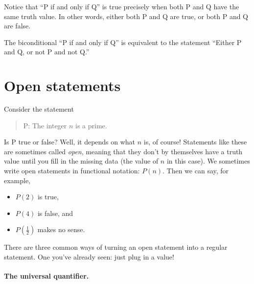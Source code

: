 \documentclass{tufte-book}
\begin{document}
Notice that ``P if and only if Q'' is true precisely when both P and Q have the same truth value. In other words, either both P and Q are true, or both P and Q are false.

\begin{proposition}\label{prop:biconditional-equiv-or}
  The biconditional ``P if and only if Q'' is equivalent to the statement ``Either P and Q, or not P and not Q.''
\end{proposition}


\section{Open statements}
\label{sec:open-statements}

Consider the statement
\begin{quote}
  P: The integer $n$ is a prime.
\end{quote}
Is P true or false? Well, it depends on what $n$ is, of course! Statements like these are sometimes called \emph{open}, meaning that they don't by themselves have a truth value until you fill in the missing data (the value of $n$ in this case). We sometimes write open statements in functional notation: $P(n)$. Then we can say, for example,
\begin{itemize}
    \item $P(2)$ is true,
    \item $P(4)$ is false, and
    \item $P(\frac12)$ makes no sense.
\end{itemize}

  There are three common ways of turning an open statement into a regular statement. One you've already seen: just plug in a value!

\paragraph{The universal quantifier.}
\label{sec:univ-quant}
\end{document}
